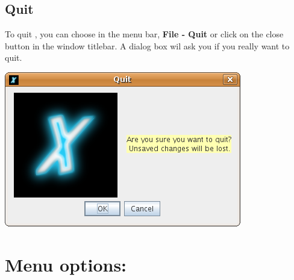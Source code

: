 \section{Quit \xlogo}
To quit \xlogo, you can choose in the menu bar, \textbf{File - Quit} or click on the close button in the window titlebar. A dialog box wil ask you if you really want to quit.
\begin{center}
 \includegraphics[scale=0.4]{pics/interface-CaptureQuit.png}
\end{center}
\chapter{Menu options:}
